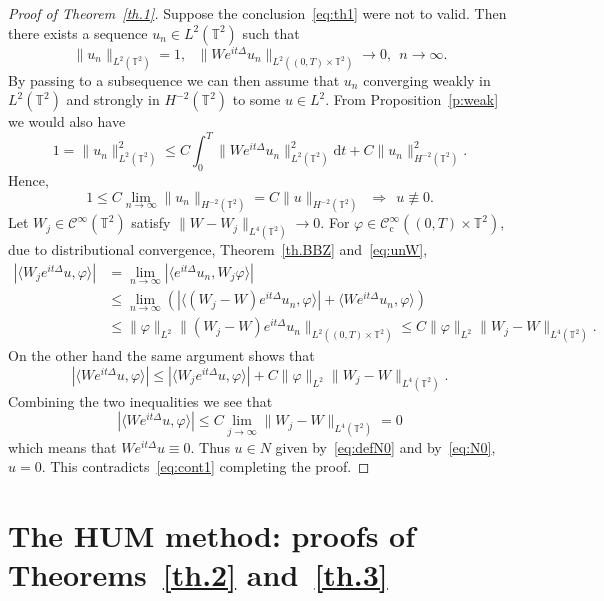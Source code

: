\documentclass[11pt]{article}
\theoremstyle{definition}
\numberwithin{equation}{section}
\numberwithin{figure}{section}
\numberwithin{table}{section}
\newcommand{\CI}{{\mathcal C}^\infty }
\newcommand{\CIc}{{\mathcal C}^\infty_{\mathrm{c}} }
\newcommand{\TT}{{\mathbb T}}
\newcommand*{\dd}{\mathrm{d}}
\newcommand*{\dt}{\dd t}
\begin{document}
\begin{proof}[Proof of Theorem~\ref{th.1}]
Suppose the conclusion~\eqref{eq:th1} were not to valid. Then there exists a sequence $ u_n \in L^2 (\TT^2) $ such that
\begin{equation}\label{eq:unW}
\| u_n \|_{ L^2 (\TT^2) } = 1, \ \ \
\| W e^{it \Delta } u_n \|_{ L^2 ((0, T) \times \TT^2) }\to 0, \ \ n
\to \infty.
\end{equation}
By passing to a subsequence we can then assume that $ u_n $ converging weakly in $ L^2 (\TT^2) $ and strongly in $ H^{-2} (\TT^2) $ to some $ u \in L^2 $. From Proposition~\ref{p:weak} we would also have
\[
1 = \| u_n \|_{ L^2 (\TT^2) }^2 \leq C
\int_0^T \| W e^{it \Delta } u_n \|_{ L^2 (\TT^2) }^2 \dt + C \| u_n \|^2_ {H^{-2} (\TT^2) }.
\]
Hence,
\begin{equation}\label{eq:cont1}
1 \leq C \lim_{n \to \infty } \| u_n \|_{H^{-2} (\TT^2) } = C\| u \|_{ H^{-2} (\TT^2) }
\ \ \Longrightarrow \ \ u \not \equiv 0.
\end{equation}
Let $ W_j \in \CI (\TT^2) $ satisfy $ \| W - W_j \|_{L^4 (\TT^2) }
\to 0 $. For $ \varphi \in \CIc ((0, T) \times \TT^2) $, due to distributional convergence, Theorem~\ref{th.BBZ} and~\eqref{eq:unW},
\[
\begin{split} |\langle W_j e^{ it\Delta } u, \varphi \rangle| & = \lim_{ n \to \infty }
|\langle e^{ it \Delta } u_n, W_j \varphi \rangle| \\
&\leq
\lim_{ n \to \infty }
\left(| \langle (W_j - W) e^{ i t \Delta } u_n, \varphi \rangle | +
\langle W e^{ it \Delta } u_n, \varphi \rangle \right) \\ & \leq
\|\varphi \|_{ L^2 } \| (W_j - W) e^{it \Delta } u_n \|_{L^2 ((0, T) \times
\TT^2) }
\leq C\|\varphi \|_{L^2 } \| W_j - W \|_{L^4(\TT^2) }.
\end{split}
\]
On the other hand the same argument shows that
\[
| \langle W e^{it \Delta }u, \varphi \rangle | \leq | \langle W_j e^{ it \Delta } u, \varphi \rangle | + C \| \varphi\|_{L^2} \| W_j - W \|_{L^4(\TT^2) }.
\]
Combining the two inequalities we see that 
\[
|\langle W e^{it \Delta }u, \varphi \rangle | \leq C
\lim_{ j \to \infty } \| W_j - W \|_{L^4(\TT^2) } = 0
\]
which means that $ W e^{ it \Delta } u \equiv 0 $. Thus $ u \in N $ given by~\eqref{eq:defN0} and by~\eqref{eq:N0}, $ u = 0 $. This contradicts~\eqref{eq:cont1} completing the proof.
\end{proof}


\section{The HUM method: proofs of Theorems~\ref{th.2} and~\ref{th.3}}\label{HUM}
\end{document}
